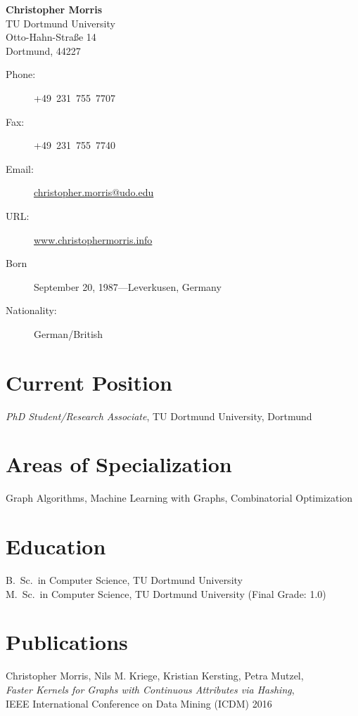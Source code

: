 \documentclass[11pt, a4paper]{scrartcl}
\newcommand{\years}[1]{\marginnote {\bf #1}}
\begin{document}
{\LARGE \bf Christopher Morris}\\[1cm] 
TU Dortmund University\\ 
Otto-Hahn-Stra\ss{}e 14\\
Dortmund, 44227

\begin{description}
	\item[Phone:] 
	+49\ 231~755~7707	
	\item[Fax:] 
	+49~231~755~7740
	\item[Email:] \href{mailto:christopher.morris@udo.edu}{christopher.morris@udo.edu}
	\item[URL:] \href{2www.christophermorris.info}{www.christophermorris.info}
	\item[Born] 
	September 20, 1987---Leverkusen, Germany
	\item[Nationality:] 
	German/British 
\end{description}

\section*{Current Position}
\emph{PhD Student/Research Associate}, TU Dortmund University, Dortmund

\section*{Areas of Specialization}
Graph Algorithms, Machine Learning with Graphs, Combinatorial Optimization

\section*{Education}
\years{2012} B.~Sc.~in Computer Science, TU Dortmund University\\
\years{2015} M.~Sc.~in Computer Science, TU Dortmund University (Final Grade: 1.0) 

\section*{Publications}

\years{2016} Christopher Morris, Nils M. Kriege, Kristian Kersting, Petra Mutzel,\\
\emph{Faster Kernels for Graphs with Continuous Attributes via Hashing},\\
IEEE International Conference on Data Mining (ICDM) 2016\\
\end{document}
